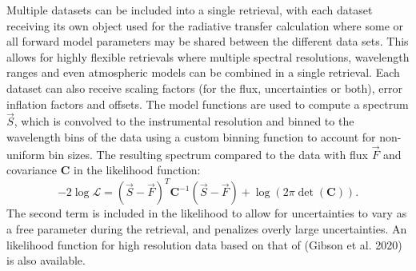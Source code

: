 \documentclass[10pt,a4paper,onecolumn]{article}
\let\textttOrig=\texttt
\def\texttt#1{\expandafter\textttOrig{\seqsplit{#1}}}
\begin{document}
Multiple datasets can be included into a single retrieval, with each
dataset receiving its own \texttt{Radtrans} object used for the
radiative transfer calculation where some or all forward model
parameters may be shared between the different data sets. This allows
for highly flexible retrievals where multiple spectral resolutions,
wavelength ranges and even atmospheric models can be combined in a
single retrieval. Each dataset can also receive scaling factors (for the
flux, uncertainties or both), error inflation factors and offsets. The
model functions are used to compute a spectrum \(\vec{S}\), which is
convolved to the instrumental resolution and binned to the wavelength
bins of the data using a custom binning function to account for
non-uniform bin sizes. The resulting spectrum compared to the data with
flux \(\vec{F}\) and covariance \(\mathbf{C}\) in the likelihood
function: \begin{equation}\label{eqn:loglike}
    -2\log\mathcal{L} = \left(\vec{S}-\vec{F}\right)^{T}\mathbf{C}^{-1}\left(\vec{S}-\vec{F}\right) + \log\left(2\pi\det\left(\mathbf{C}\right)\right).
\end{equation} The second term is included in the likelihood to allow
for uncertainties to vary as a free parameter during the retrieval, and
penalizes overly large uncertainties. An likelihood function for high
resolution data based on that of (Gibson et al. 2020) is also available.
\end{document}
